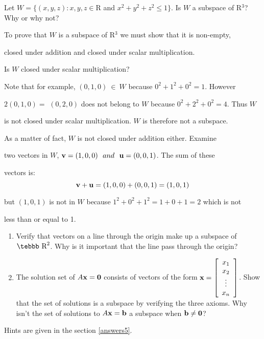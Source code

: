 \begin{example}
\label{exam5.subspaces1}

\noindent Let $W=\{(x,y,z): x,y,z \in ${\tebbb R} and $
x^2+y^2+z^2 \leq 1 \}$. Is $W$ a subspace of {\tebbb R}$^{3}$? Why
or why not?

To prove that $W$ is a subspace of {\tebbb R}$^{3}$ we must show
that it is non-empty,

closed under addition and closed under scalar multiplication.

Is $W$ closed under scalar multiplication?

Note that for example, $(0,1,0)~\in~W$ because $0^2+1^2+0^2=1$. However

$2(0,1,0)=$ $(0,2,0)$ does not belong to $W$ because $0^2+2^2+0^2=4$. Thus $W$

is not closed under scalar multiplication. $W$ is therefore not a subspace.

As a matter of fact, $W$ is not closed under addition either. Examine

two vectors in $W$, ${\bf v}=(1,0,0)\ \ and\ \ {\bf u}=(0,0,1)$. The sum of these

vectors is: $${\bf v}+ {\bf u}= (1,0,0)+(0,0,1)=(1,0,1)$$

but $(1,0,1)$ is not in $W$ because $1^2+0^2+1^2=1+0+1=2$ which is
not

less than or equal to 1.

\end{example}


\begin{enumerate}
\item Verify that vectors on a line through the origin make up a
subspace of $\mbox{\tebbb R}^2$. Why is it important that the line
pass through the origin?
\item The solution set of $A{\bf x}={\bf 0}$ consists of vectors
of the form ${\bf x}=\left [ \begin{array}{c} x_1\\x_2\\ \vdots\\
x_n \end{array} \right ]$.  Show that the set of
solutions is a subspace by verifying the three axioms. Why isn't
the set of solutions to $A{\bf x}={\bf b}$ a subspace when ${\bf
b}\neq {\bf 0}$?
\end{enumerate}

\noindent Hints are given in the section \ref{answers5}.


